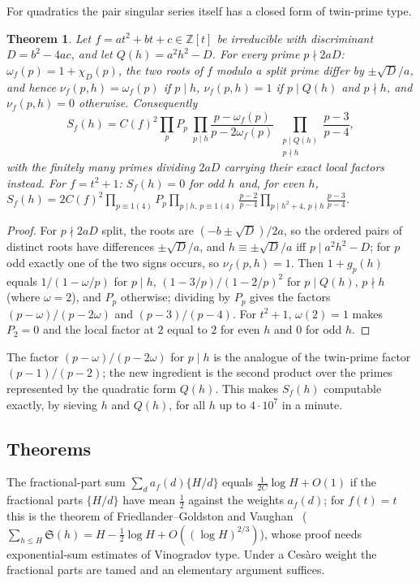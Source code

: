 \documentclass[11pt,a4paper]{article}
\newtheorem{theorem}{Theorem}
\theoremstyle{remark}\newtheorem{remark}[theorem]{Remark}
\newcommand{\Z}{\mathbb{Z}}
\newcommand{\Sig}{\mathfrak S}
\begin{document}
For quadratics the pair singular series itself has a closed form of twin-prime type.

\begin{theorem}\label{thm:quadratic}
Let $f=at^2+bt+c\in\Z[t]$ be irreducible with discriminant $D=b^2-4ac$, and let $Q(h)=a^2h^2-D$. For
every prime $p\nmid 2aD$: $\omega_f(p)=1+\chi_D(p)$, the two roots of $f$ modulo a split prime differ by
$\pm\sqrt D/a$, and hence $\nu_f(p,h)=\omega_f(p)$ if $p\mid h$, $\nu_f(p,h)=1$ if $p\mid Q(h)$ and $p\nmid h$,
and $\nu_f(p,h)=0$ otherwise. Consequently
\[
S_f(h)=C(f)^2\prod_pP_p\;\prod_{p\mid h}\frac{p-\omega_f(p)}{p-2\omega_f(p)}\;\prod_{\substack{p\mid Q(h)\\p\nmid h}}\frac{p-3}{p-4},
\]
with the finitely many primes dividing $2aD$ carrying their exact local factors instead. For $f=t^2+1$:
$S_f(h)=0$ for odd $h$ and, for even $h$,
$S_f(h)=2C(f)^2\prod_{p\equiv1(4)}P_p\prod_{p\mid h,\,p\equiv1(4)}\frac{p-2}{p-4}\prod_{p\mid h^2+4,\,p\nmid h}\frac{p-3}{p-4}$.
\end{theorem}

\begin{proof}
For $p\nmid 2aD$ split, the roots are $(-b\pm\sqrt D)/2a$, so the ordered pairs of distinct roots have
differences $\pm\sqrt D/a$, and $h\equiv\pm\sqrt D/a$ iff $p\mid a^2h^2-D$; for $p$ odd exactly one of the two
signs occurs, so $\nu_f(p,h)=1$. Then $1+g_p(h)$ equals $1/(1-\omega/p)$ for $p\mid h$, $(1-3/p)/(1-2/p)^2$
for $p\mid Q(h)$, $p\nmid h$ (where $\omega=2$), and $P_p$ otherwise; dividing by $P_p$ gives the factors
$(p-\omega)/(p-2\omega)$ and $(p-3)/(p-4)$. For $t^2+1$, $\omega(2)=1$ makes $P_2=0$ and the local factor at
$2$ equal to $2$ for even $h$ and $0$ for odd $h$.
\end{proof}

The factor $(p-\omega)/(p-2\omega)$ for $p\mid h$ is the analogue of the twin-prime factor $(p-1)/(p-2)$;
the new ingredient is the second product over the primes represented by the quadratic form $Q(h)$. This
makes $S_f(h)$ computable exactly, by sieving $h$ and $Q(h)$, for all $h$ up to $4\cdot10^7$ in a minute.

\subsection{Theorems}\label{sec:thms}

The fractional-part sum $\sum_d a_f(d)\{H/d\}$ equals $\frac1{2C}\log H+O(1)$ if the fractional parts
$\{H/d\}$ have mean $\tfrac12$ against the weights $a_f(d)$; for $f(t)=t$ this is the theorem of
Friedlander--Goldston and Vaughan~\cite{FriedlanderGoldston1995,Vaughan2001}
($\sum_{h\le H}\Sig(h)=H-\tfrac12\log H+O((\log H)^{2/3})$), whose proof needs exponential-sum
estimates of Vinogradov type. Under a Ces\`aro weight the fractional parts are tamed and an elementary
argument suffices.
\end{document}
